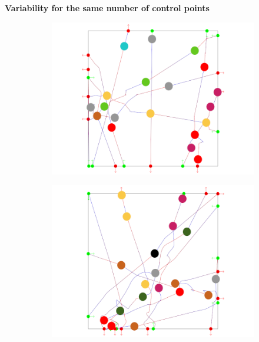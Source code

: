 \textbf{Variability for the same number of control points}

\begin{figure}[t]
 \centering
 \begin{subfigure}[b]{0.24\linewidth}
 	\includegraphics[width=\linewidth]{images/res-10-withAgents_1.png}
 	\caption{}
 \end{subfigure}
 \begin{subfigure}[b]{0.24\linewidth}
 	\includegraphics[width=\linewidth]{images/res-10-withAgents_2.png}
 	\caption{}
 \end{subfigure}
 \begin{subfigure}[b]{0.24\linewidth}

\end{subfigure}
\end{figure}
